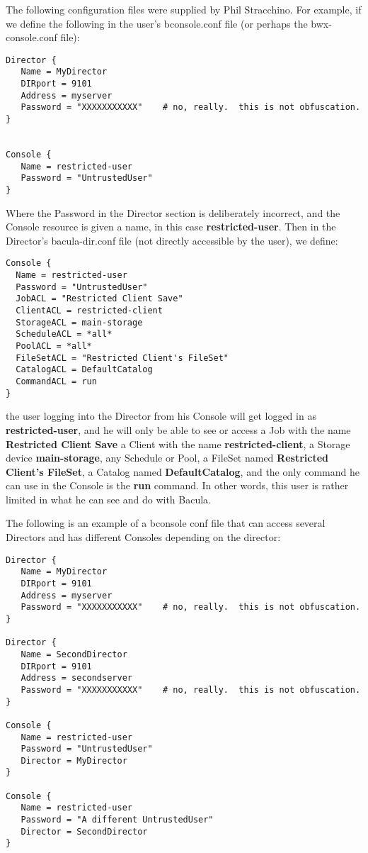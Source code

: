 The following configuration files were supplied by Phil Stracchino. For
example, if we define the following in the user's bconsole.conf file (or
perhaps the bwx-console.conf file): 

\footnotesize
\begin{verbatim}
Director {
   Name = MyDirector
   DIRport = 9101
   Address = myserver
   Password = "XXXXXXXXXXX"    # no, really.  this is not obfuscation.
}

 
Console {
   Name = restricted-user
   Password = "UntrustedUser"
}
\end{verbatim}
\normalsize

Where the Password in the Director section is deliberately incorrect, and the
Console resource is given a name, in this case {\bf restricted-user}. Then
in the Director's bacula-dir.conf file (not directly accessible by the user),
we define: 

\footnotesize
\begin{verbatim}
Console {
  Name = restricted-user
  Password = "UntrustedUser"
  JobACL = "Restricted Client Save"
  ClientACL = restricted-client
  StorageACL = main-storage
  ScheduleACL = *all*
  PoolACL = *all*
  FileSetACL = "Restricted Client's FileSet"
  CatalogACL = DefaultCatalog
  CommandACL = run
}
\end{verbatim}
\normalsize

the user logging into the Director from his Console will get logged in as {\bf
restricted-user}, and he will only be able to see or access a Job with the
name {\bf Restricted Client Save} a Client with the name {\bf
restricted-client}, a Storage device {\bf main-storage}, any Schedule or Pool,
a FileSet named {\bf Restricted Client's FileSet}, a Catalog named {\bf
DefaultCatalog}, and the only command he can use in the Console is the {\bf
run} command. In other words, this user is rather limited in what he can see
and do with Bacula. 

The following is an example of a bconsole conf file that can access
several Directors and has different Consoles depending on the director:

\footnotesize
\begin{verbatim}
Director {
   Name = MyDirector
   DIRport = 9101
   Address = myserver
   Password = "XXXXXXXXXXX"    # no, really.  this is not obfuscation.
}

Director {
   Name = SecondDirector
   DIRport = 9101
   Address = secondserver
   Password = "XXXXXXXXXXX"    # no, really.  this is not obfuscation.
}

Console {
   Name = restricted-user
   Password = "UntrustedUser"
   Director = MyDirector
}

Console {
   Name = restricted-user
   Password = "A different UntrustedUser"
   Director = SecondDirector
}
\end{verbatim}
\normalsize

